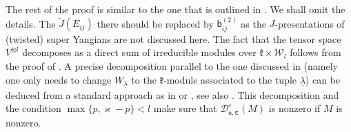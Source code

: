 \documentclass[11pt,reqno]{amsart}
\numberwithin{equation}{section}
\theoremstyle{definition}
\theoremstyle{remark}
\newcommand{\mc}{\mathcal}
\newcommand{\sfb}{\mathsf{b}}
\newcommand{\la}{\lambda}
\newcommand{\ka}{\varkappa}
\newcommand{\ve}{\varepsilon}
\newcommand{\s}{{\bm s}}
\begin{document}
The rest of the proof is similar to the one that is outlined in \cite[proof of Theorem 4.3]{Chen2014twisted}. We shall omit the details. The $\widetilde J(E_{ij})$ there should be replaced by $\sfb_{ij}^{(2)}$ as the $J$-presentations of (twisted) super Yangians are not discussed here. The fact that the tensor space $V^{\otimes l}$ decomposes as a direct sum of irreducible modules over $\mathfrak k\times \mathscr W_l$ follows from the proof of \cite[Theorem 5.8]{Shen2025quantum}. A precise decomposition parallel to the one discussed in \cite[Introduction]{Ariki1995schur} (namely one only needs to change $W_{\underline{\la}}$ to the $\mathfrak k$-module associated to the tuple $\underline{\la}$) can be deduced from a standard approach as in \cite[Theorem 3.11]{Cheng2009dualities} or \cite{Ariki1995schur}, see also \cite[Chapter II]{Kerber1971reps}. This decomposition and the condition $\max\{p,\ka-p\}<l$ make sure that $\mc D^{\ve}_{\s,\bm\ve}(M)$ is nonzero if $M$ is nonzero.


















\end{document}
